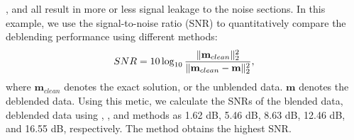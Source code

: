  , and  all result in more or less signal leakage \cite[]{yangkang2015ortho} to the noise sections. In this example, we use the signal-to-noise ratio (SNR) to quantitatively compare the deblending performance using different methods:
\begin{equation}
\label{eq:diff}
SNR=10\log_{10}\frac{\Arrowvert \mathbf{m}_{clean} \Arrowvert_2^2}{\Arrowvert \mathbf{m}_{clean} -\mathbf{m}\Arrowvert_2^2},
\end{equation}
where $\mathbf{m}_{clean}$ denotes the exact solution, or the unblended data. $\mathbf{m}$ denotes the deblended data. Using this metic, we calculate the SNRs of the blended data, deblended data using  , , and  methods as 1.62 dB, 5.46 dB, 8.63 dB, 12.46 dB, and 16.55 dB, respectively. The  method obtains the highest SNR.

